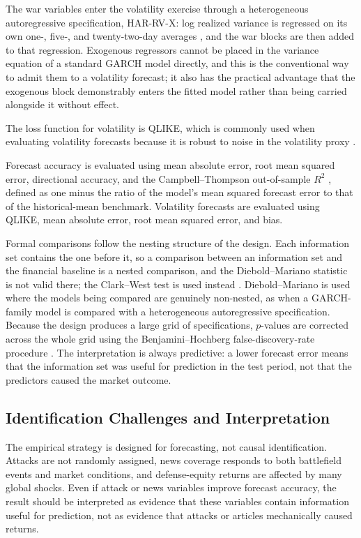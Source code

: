 \documentclass[12pt,a4paper]{article}
\begin{document}
The war variables enter the volatility exercise through a heterogeneous autoregressive specification, HAR-RV-X: log realized variance is regressed on its own one-, five-, and twenty-two-day averages \citep{corsi2009har}, and the war blocks are then added to that regression. Exogenous regressors cannot be placed in the variance equation of a standard GARCH model directly, and this is the conventional way to admit them to a volatility forecast; it also has the practical advantage that the exogenous block demonstrably enters the fitted model rather than being carried alongside it without effect.

The loss function for volatility is QLIKE, which is commonly used when evaluating volatility forecasts because it is robust to noise in the volatility proxy \citep{patton2011volatility}.

Forecast accuracy is evaluated using mean absolute error, root mean squared error, directional accuracy, and the Campbell--Thompson out-of-sample $R^2$ \citep{campbell2008predicting}, defined as one minus the ratio of the model's mean squared forecast error to that of the historical-mean benchmark. Volatility forecasts are evaluated using QLIKE, mean absolute error, root mean squared error, and bias.

Formal comparisons follow the nesting structure of the design. Each information set contains the one before it, so a comparison between an information set and the financial baseline is a nested comparison, and the Diebold--Mariano statistic \citep{diebold1995predictive} is not valid there; the Clark--West test is used instead \citep{clark2007nested}. Diebold--Mariano is used where the models being compared are genuinely non-nested, as when a GARCH-family model is compared with a heterogeneous autoregressive specification. Because the design produces a large grid of specifications, $p$-values are corrected across the whole grid using the Benjamini--Hochberg false-discovery-rate procedure \citep{benjamini1995fdr}. The interpretation is always predictive: a lower forecast error means that the information set was useful for prediction in the test period, not that the predictors caused the market outcome.

\subsection{Identification Challenges and Interpretation}

The empirical strategy is designed for forecasting, not causal identification. Attacks are not randomly assigned, news coverage responds to both battlefield events and market conditions, and defense-equity returns are affected by many global shocks. Even if attack or news variables improve forecast accuracy, the result should be interpreted as evidence that these variables contain information useful for prediction, not as evidence that attacks or articles mechanically caused returns.
\end{document}
